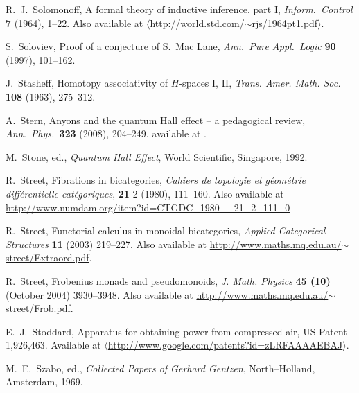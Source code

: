 \documentclass[12pt,twoside,openright]{report}
\begin{document}
\begin{thebibliography}{99}
 R.\ J.\ Solomonoff, A formal theory of inductive inference, part I, {\sl Inform.\ Control} {\bf 7} (1964),
1--22.  Also available at 
\hfill \break
\href{http://world.std.com/~rjs/1964pt1.pdf}
{$\langle$http://world.std.com/$\sim$rjs/1964pt1.pdf$\rangle$}.

 S.\ Soloviev, Proof of a conjecture of S.\ Mac Lane, {\sl Ann.\ Pure Appl.\ Logic} {\bf 90} (1997), 101--162.

 J.\ Stasheff, Homotopy associativity of $H$-spaces I, II, \textsl{Trans. Amer. Math. Soc.} \textbf{108} (1963), 275--312.

 A.\ Stern, Anyons and the quantum Hall effect --
a pedagogical review, {\sl Ann.\ Phys.\ }{\bf 323} (2008), 204--249. available at .

 M.\ Stone, ed., {\sl Quantum Hall Effect}, World Scientific, Singapore, 1992.

 R.\ Street, Fibrations in bicategories, \textsl{Cahiers de topologie et g\'eom\'etrie diff\'erentielle cat\'egoriques}, 
\textbf{21} 2 (1980),  111--160.  Also available at \\ \href{http://www.numdam.org/item?id=CTGDC_1980__21_2_111_0}{http://www.numdam.org/item?id=CTGDC\_1980\_\_21\_2\_111\_0}

 R.\ Street, Functorial calculus in monoidal bicategories, \textsl{Applied Categorical Structures} \textbf{11} (2003) 219--227.  Also available at
\href{http://www.maths.mq.edu.au/~street/Extraord.pdf}{http://www.maths.mq.edu.au/$\sim$street/Extraord.pdf}.

 R.\ Street, Frobenius monads and pseudomonoids, \textsl{J. Math. Physics} \textbf{45 (10)} (October 2004) 3930--3948.  Also available at
\href{http://www.maths.mq.edu.au/~street/Frob.pdf}{http://www.maths.mq.edu.au/$\sim$street/Frob.pdf}.

 E.\ J.\ Stoddard, Apparatus for obtaining power from compressed air, US Patent 1,926,463.  Available at 
\hfill \break
\href{http://www.google.com/patents?id=zLRFAAAAEBAJ}
{$\langle$http://www.google.com/patents?id=zLRFAAAAEBAJ$\rangle$}.

 M.\ E.\ Szabo, ed., {\sl Collected Papers of Gerhard Gentzen}, North--Holland, Amsterdam, 1969.



\end{thebibliography}
\end{document}
